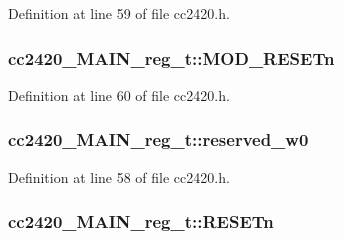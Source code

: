 Definition at line 59 of file cc2420.\+h.

\subsubsection[{\texorpdfstring{M\+O\+D\+\_\+\+R\+E\+S\+E\+Tn}{MOD_RESETn}}]{ cc2420\+\_\+\+M\+A\+I\+N\+\_\+reg\+\_\+t\+::\+M\+O\+D\+\_\+\+R\+E\+S\+E\+Tn}\hypertarget{structcc2420___m_a_i_n__reg__t_a4131daa970a92ca146379a4ca9ce9b07}{}\label{structcc2420___m_a_i_n__reg__t_a4131daa970a92ca146379a4ca9ce9b07}


Definition at line 60 of file cc2420.\+h.

\subsubsection[{\texorpdfstring{reserved\+\_\+w0}{reserved_w0}}]{ cc2420\+\_\+\+M\+A\+I\+N\+\_\+reg\+\_\+t\+::reserved\+\_\+w0}\hypertarget{structcc2420___m_a_i_n__reg__t_ac0d303fde870b6c2dfc28ac55e88d0be}{}\label{structcc2420___m_a_i_n__reg__t_ac0d303fde870b6c2dfc28ac55e88d0be}


Definition at line 58 of file cc2420.\+h.

\subsubsection[{\texorpdfstring{R\+E\+S\+E\+Tn}{RESETn}}]{ cc2420\+\_\+\+M\+A\+I\+N\+\_\+reg\+\_\+t\+::\+R\+E\+S\+E\+Tn}\hypertarget{structcc2420___m_a_i_n__reg__t_a3f5e1b943b2ae4dcbcf612a1520e09d3}{}\label{structcc2420___m_a_i_n__reg__t_a3f5e1b943b2ae4dcbcf612a1520e09d3}


